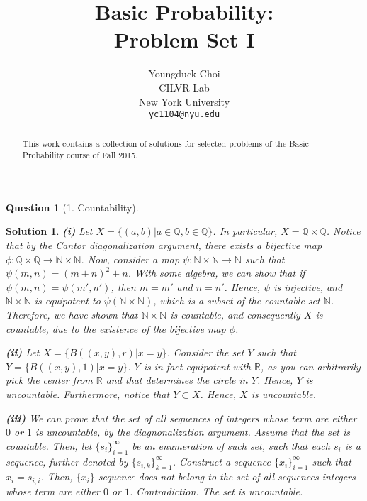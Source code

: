 \documentclass{article} %
\title{Basic Probability: \\
Problem Set I}
\author{
Youngduck Choi \\
CILVR Lab \\
New York University\\
\texttt{yc1104@nyu.edu} \\
}
\theoremstyle{quest}
\newtheorem*{question}{Question}
\newtheorem*{solution}{Solution}
\begin{document}
\maketitle

\begin{abstract}
This work contains a collection of solutions for selected problems 
of the Basic Probability course of Fall 2015.
\end{abstract}

\begin{question}[1. Countability]
\end{question}
\begin{solution}
\textbf{(i)}
Let $X = \{ (a,b) | a \in \mathbb{Q}, b \in \mathbb{Q} \}$. In particular, $X = \mathbb{Q}
\times \mathbb{Q}$. Notice that by the Cantor diagonalization argument, there exists
a bijective map $\phi: \mathbb{Q} \times \mathbb{Q} \to \mathbb{N} \times \mathbb{N}$. Now,
consider a map $\psi: \mathbb{N} \times \mathbb{N} \to \mathbb{N}$ such that $\psi(m,n) = (m+n)^2 + n$.
With some algebra, we can show that if $\psi(m,n) = \psi(m',n')$, then $m = m'$ and $n = n'$. Hence,
$\psi$ is injective, and $\mathbb{N} \times \mathbb{N}$ is equipotent to $\psi(\mathbb{N} \times \mathbb{N})$,
which is a subset of the countable set $\mathbb{N}$. Therefore, we have shown that $\mathbb{N} \times \mathbb{N}$
is countable, and consequently $X$ is countable, due to the existence of the bijective map $\phi$.

\bigskip

\textbf{(ii)}
Let $X = \{ B((x,y),r) | x = y \}$. Consider the set $Y$ such that $Y = \{ B((x,y),1) | x = y \}$. $Y$ is in fact
equipotent with $\mathbb{R}$, as you can arbitrarily pick the center from $\mathbb{R}$ and that determines the
circle in $Y$. Hence, $Y$ is uncountable. Furthermore, notice that $Y \subset X$. Hence, $X$ is uncountable.

\bigskip

\textbf{(iii)}
We can prove that the set of all sequences of integers whose term are either $0$ or $1$ is uncountable,
by the diagnonalization argument. Assume that the set is countable. Then, let $\{ s_i \}_{i=1}^{\infty}$
be an enumeration of such set, such that each $s_i$ is a sequence, further denoted by
$\{ s_{i,k} \}_{k=1}^{\infty}$. Construct a sequence $\{ x_i \}_{i=1}^{\infty}$ such that $x_i = s_{i,i}$.
Then, $\{ x_i \}$ sequence does not belong to the set of all sequences integers whose term are 
either $0$ or $1$. Contradiction. The set is uncountable.

\end{solution}
\end{document}
